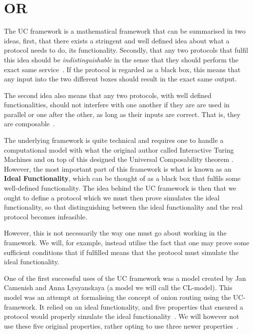 \section{ \acl*{OR}}%
\label{UCOR}
The \ac{UC} framework is a mathematical framework that can be summarised in
two ideas, first, that there exists a stringent and well defined idea
about what a protocol needs to do, its functionality. Secondly, that
any two protocols that fulfil this idea should be {\it
  indistinguishable\/} in the sense that they should perform the exact
same service~\cite{UniversalComposability}. If the protocol is regarded as a black box, this means
that any input into the two different boxes should result in the
exact same output.

The second idea also means that any two protocols, with well defined
functionalities, should not interfere with one another if they are
are used in parallel or one after the other, as long as their inputs
are correct. That is, they are composable~\cite{UniversalComposability}.

The underlying framework is quite technical and requires one to handle
a computational model with what the original author %
called Interactive Turing Machines and on top of this designed the
Universal Composability theorem \cite{UniversalComposability}. However, the most important part of
this framework is what is known as an {\bf Ideal Functionality}, which
can be thought of as a black box that fulfils some well-defined
functionality\cite{UniversalComposability}. The idea behind the \ac{UC} framework is then that we ought
to define a protocol which we must then prove simulates the ideal
functionality, so that distinguishing between the ideal functionality
and the real protocol becomes infeasible.

However, this is not necessarily the way one must go about working in
the framework. We will, for example, instead utilise the fact that one
may prove some sufficient conditions that if fulfilled means that the
protocol must simulate the ideal functionality.

One of the first successful uses of the \ac{UC} framework was a model
created by Jan Camenish and Anna Lysyanskaya (a model we will call the
CL-model). This model was an attempt at formalising the concept of
onion routing using the UC-framework. It relied on an ideal
functionality, and five properties that ensured a protocol would properly
simulate the ideal functionality~\cite{CL-model}. We will however not
use these five original properties, rather opting to use three newer
properties~\cite{kuhn}.

